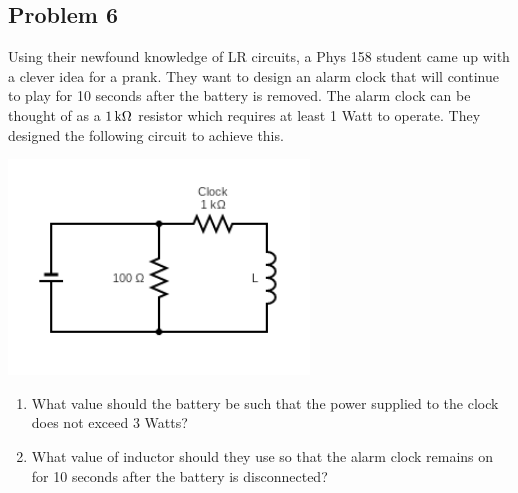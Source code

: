 \subsection*{Problem 6}
Using their newfound knowledge of LR circuits, a Phys 158 student came up with a clever idea for a prank. They want to design an alarm clock that will continue to play for 10 seconds after the battery is removed. The alarm clock can be thought of as a $1\,\mathrm{k\Omega}$ resistor which requires at least 1 Watt to operate. They designed the following circuit to achieve this.\\
\centerline{\includegraphics[width=0.6\textwidth]{Images/P6img1.png}}
\begin{enumerate}
\item What value should the battery be such that the power supplied to the clock does not exceed 3 Watts?\\
\item What value of inductor should they use so that the alarm clock remains on for 10 seconds after the battery is disconnected?
\end{enumerate}

